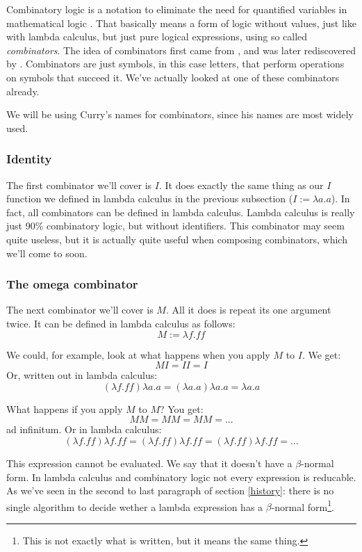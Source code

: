 \documentclass[11pt]{article}
\begin{document}
Combinatory logic is a notation to eliminate the need for quantified variables
in mathematical logic \parencite{wiki:Combinatory_logic}. That basically means
a form of logic without values, just like with lambda calculus, but just pure
logical expressions, using so called \emph{combinators}. The idea of
combinators first came from \textcite{schonfinkel1924}, and was later
rediscovered by \textcite{curry1930}. Combinators are just symbols, in this
case letters, that perform operations on symbols that succeed it. We've
actually looked at one of these combinators already.

We will be using Curry's names for combinators, since his names are most widely
used.

\subsubsection{Identity}

The first combinator we'll cover is \(I\). It does exactly the same thing as
our \(I\) function we defined in lambda calculus in the previous subsection
(\(I:=\lambda a.a\)). In fact, all combinators can be defined in lambda
calculus. Lambda calculus is really just 90\% combinatory logic, but without
identifiers. This combinator may seem quite useless, but it is actually quite
useful when composing combinators, which we'll come to soon.

\subsubsection{The omega combinator}\label{omega}

The next combinator we'll cover is \(M\). All it does is repeat its one
argument twice. It can be defined in lambda calculus as follows:
\[M:=\lambda f.ff\]

We could, for example, look at what happens when you apply \(M\) to \(I\). We
get:
\[M I = I I = I\]
Or, written out in lambda calculus:
\[(\lambda f.ff)\lambda a.a=(\lambda a.a)\lambda a.a=\lambda a.a\]

What happens if you apply \(M\) to \(M\)? You get:
\[M M = M M = M M = ...\]
ad infinitum. Or in lambda calculus:
\[(\lambda f.ff)\lambda f.ff=(\lambda f.ff)\lambda f.ff=(\lambda f.ff)\lambda f.ff=...\]

This expression cannot be evaluated. We say that it doesn't have a
\(\beta\)-normal form. In lambda calculus and combinatory logic not every
expression is reducable. As we've seen in the second to last paragraph of
section \ref{history}: there is no single algorithm to decide wether a lambda
expression has a \(\beta\)-normal form\footnote{This is not exactly what is
written, but it means the same thing.}.
\end{document}
